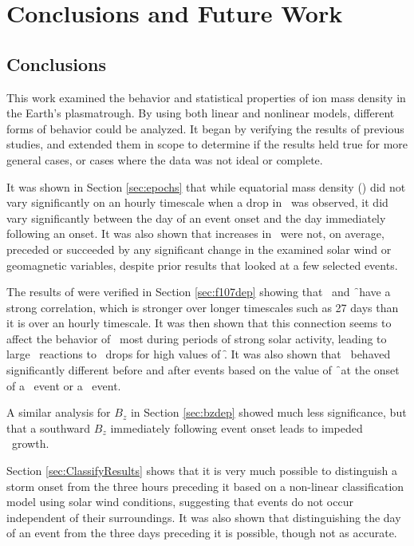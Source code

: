 \chapter[Conclusions and Future Work]{Conclusions and Future Work}

\section{Conclusions}
This work examined the behavior and statistical properties of ion mass density in the Earth's plasmatrough. By using both linear and nonlinear models, different forms of behavior could be analyzed. It began by verifying the results of previous studies, and extended them in scope to determine if the results held true for more general cases, or cases where the data was not ideal or complete. 

It was shown in Section \ref{sec:epochs} that while equatorial mass density (\req) did not vary significantly on an hourly timescale when a drop in \dst\ was observed, it did vary significantly between the day of an event onset and the day immediately following an onset. It was also shown that increases in \req\ were not, on average, preceded or succeeded by any significant change in the examined solar wind or geomagnetic variables, despite prior results that looked at a few selected events. 

The results of \cite{Takahashi2010SolarCycleVariation} were verified in Section \ref{sec:f107dep} showing that \req\ and \f\ have a strong correlation, which is stronger over longer timescales such as 27 days than it is over an hourly timescale. It was then shown that this connection seems to affect the behavior of \req\ most during periods of strong solar activity, leading to large \req\ reactions to \dst\ drops for high values of \f.  It was also shown that \req\ behaved significantly different before and after events based on the value of \f\ at the onset of a \req\ event or a \dst\ event.  

A similar analysis for $B_z$ in Section \ref{sec:bzdep} showed much less significance, but that a southward $B_z$ immediately following event onset leads to impeded \req\ growth.

Section \ref{sec:ClassifyResults} shows that it is very much possible to distinguish a storm onset from the three hours preceding it based on a non-linear classification model using solar wind conditions, suggesting that events do not occur independent of their surroundings. It was also shown that distinguishing the day of an event from the three days preceding it is possible, though not as accurate.

